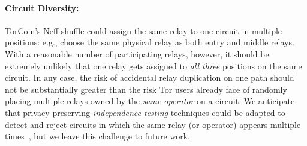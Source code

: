 \paragraph{Circuit Diversity:}  
TorCoin's Neff shuffle could assign the same relay to one circuit in multiple
positions: e.g., choose the same physical relay as both entry and middle
relays. With a reasonable number of participating relays, however,
it should be extremely unlikely that one relay gets assigned
to {\em all three} positions on the same circuit.
In any case, the risk of accidental relay duplication on one path
should not be substantially greater than the risk
Tor users already face of randomly placing multiple relays
owned by the {\em same operator} on a circuit.
We anticipate that privacy-preserving {\em independence testing} techniques
could be adapted to detect and reject circuits in which the same relay
(or operator) appears multiple times~\cite{zhai13untold},
but we leave this challenge to future work.
